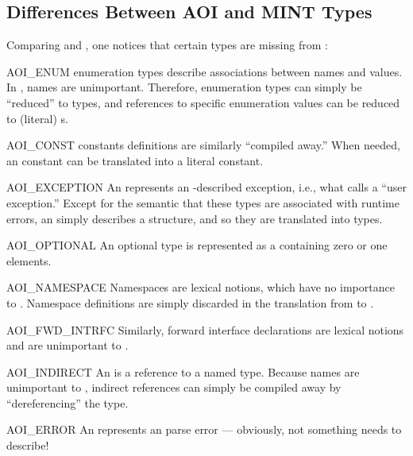 

\subsection{Differences Between AOI and MINT Types}
\label{subsec:MINT:Differences Between AOI and MINT Types}

Comparing \AOI{} and \MINT{}, one notices that certain \AOI{} types are missing
from \MINT{}:

\begin{cidentifierlist}
  \item[AOI_ENUM]
  \AOI{} enumeration types describe associations between names and values.  In
  \MINT{}, names are unimportant.  Therefore, \AOI{} enumeration types can
  simply be ``reduced'' to  types, and references to specific
  enumeration values can be reduced to (literal) s.

  \item[AOI_CONST]
  \AOI{} constants definitions are similarly ``compiled away.''  When needed,
  an \AOI{} constant can be translated into a literal \MINT{} constant.

  \item[AOI_EXCEPTION]
  An  represents an \IDL{}-described exception, i.e., what
  \CORBA{} calls a ``user exception.''  Except for the semantic that these
  types are associated with runtime errors, an  simply
  describes a structure, and so they are translated into 
  types.

  \item[AOI_OPTIONAL]
  An optional type is represented as a  containing zero or one
  elements.

  \item[AOI_NAMESPACE]
  Namespaces are lexical notions, which have no importance to \MINT{}\@.
  Namespace definitions are simply discarded in the translation from \AOI{} to
  \MINT{}\@.

  \item[AOI_FWD_INTRFC]
  Similarly, forward interface declarations are lexical notions and are
  unimportant to \MINT{}\@.

  \item[AOI_INDIRECT]
  An  is a reference to a named type.  Because names are
  unimportant to \MINT{}, indirect references can simply be compiled away by
  ``dereferencing'' the  type.

  \item[AOI_ERROR]
  An  represents an \IDL{} parse error --- obviously, not
  something \MINT{} needs to describe!
\end{cidentifierlist}


